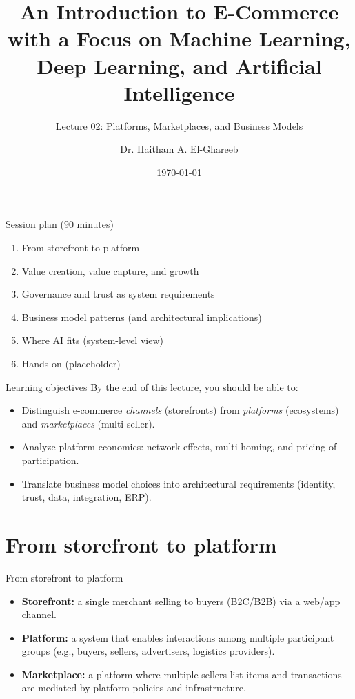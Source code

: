 \documentclass[aspectratio=169]{beamer}
\title[Lecture 02]{An Introduction to E-Commerce\\\small with a Focus on Machine Learning, Deep Learning, and Artificial Intelligence}
\subtitle{Lecture 02: Platforms, Marketplaces, and Business Models}
\author{Dr. Haitham A. El-Ghareeb}
\institute{Faculty of Computers and Information Sciences \\ Mansoura University \\ Egypt}
\date{\today}
\begin{document}
\begin{frame}
  \titlepage
\end{frame}

\begin{frame}{Session plan (90 minutes)}
  \begin{enumerate}
    \item From storefront to platform
    \item Value creation, value capture, and growth
    \item Governance and trust as system requirements
    \item Business model patterns (and architectural implications)
    \item Where AI fits (system-level view)
    \item Hands-on (placeholder)
  \end{enumerate}
\end{frame}

\begin{frame}{Learning objectives}
  By the end of this lecture, you should be able to:
  \begin{itemize}
    \item Distinguish e-commerce \emph{channels} (storefronts) from \emph{platforms} (ecosystems) and \emph{marketplaces} (multi-seller).
    \item Analyze platform economics: network effects, multi-homing, and pricing of participation.
    \item Translate business model choices into architectural requirements (identity, trust, data, integration, ERP).
  \end{itemize}
\end{frame}

\section{From storefront to platform}

\begin{frame}{From storefront to platform}
  \begin{itemize}
    \item \textbf{Storefront:} a single merchant selling to buyers (B2C/B2B) via a web/app channel.
    \item \textbf{Platform:} a system that enables interactions among multiple participant groups (e.g., buyers, sellers, advertisers, logistics providers).
    \item \textbf{Marketplace:} a platform where multiple sellers list items and transactions are mediated by platform policies and infrastructure.
  \end{itemize}
\end{frame}
\end{document}
